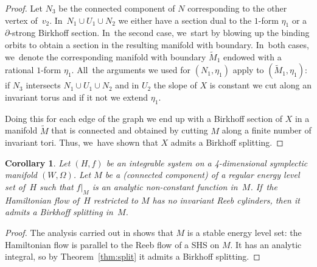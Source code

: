 \documentclass[JEP,XML,SOM,Unicode,NoEqCountersInSection,NoFloatCountersInSection,published]{cedram}
\newtheorem{Corollary}[theorem]{Corollary}
\theoremstyle{definition}
\begin{document}
\begin{proof}
Let $N_3$ be the connected component of $N$ corresponding to the other vertex of~$v_2$. In~$N_1\cup U_1\cup N_2$ we either have a section dual to the $1$-form $\eta_1$ or a $\partial$-strong Birkhoff section. In~the second case, we~start by blowing up the binding orbits to obtain a section in the resulting manifold with boundary. In~both cases, we~denote the corresponding manifold with boundary $\widetilde{M}_1$ endowed with a rational $1$-form $\eta_1$.
All~the arguments we used for $(N_1,\eta_1)$ apply to $(\widetilde{M}_1,\eta_1)$: if $N_3$ intersects $N_1\cup U_1\cup N_2$ and in $U_2$ the slope of $X$ is constant we cut along an invariant torus and if it not we extend $\eta_1$.

Doing this for each edge of the graph we end up
with a Birkhoff section of $X$ in a manifold $\widetilde M$ that is connected and obtained by cutting $M$ along a finite number of invariant tori. Thus, we~have shown that $X$ admits a Birkhoff splitting.
\end{proof}

\begin{Corollary}
Let $(H,f)$ be an integrable system on a 4-dimensional symplectic manifold $(W,\Omega)$. Let $M$ be a (connected component) of a regular energy level set of~$H$ such that $f|_M$ is an analytic non-constant function in~$M$. If~the Hamiltonian flow of~$H$ restricted to $M$ has no invariant Reeb cylinders, then it admits a Birkhoff splitting in~$M$.
\end{Corollary}

\begin{proof}
The analysis carried out in \cite[\S\S 2 \& 3]{CV2} shows that $M$ is a stable energy level set: the Hamiltonian flow is parallel to the Reeb flow of a SHS on $M$. It has an analytic integral, so by Theorem~\ref{thm:split} it admits a Birkhoff splitting.
\end{proof}

\backmatter


\end{document}
